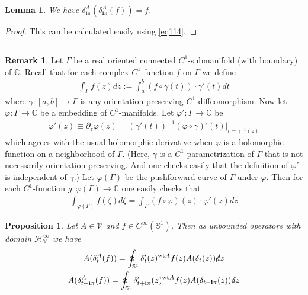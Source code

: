\documentclass[12pt,b5paper,notitlepage]{article}
\theoremstyle{definition}
\newtheorem{rem}[df]{Remark}
\theoremstyle{plain}
\newtheorem{pp}[df]{Proposition}
\newtheorem{lm}[df]{Lemma}
\newcommand{\mc}{\mathcal}
\newcommand{\im}{\mathbf{i}}
\newcommand{\Cbb}{\mathbb C}
\newcommand{\wt}{\mathrm{wt}}
\newcommand{\Sbb}{{\mathbb S}}
\newcommand{\HV}{\mathcal H_{\mathbb V}}
\newcommand{\ointn}{\oint\nolimits}
\newcommand{\sd}{\slashed{d}}
\numberwithin{equation}{section}
\begin{document}
\begin{lm}\label{lb84}
We have $\delta^A_{\im\pi}(\delta^A_{\im\pi}(f))=f$.
\end{lm}


\begin{proof}
This can be calculated easily using \eqref{eq114}.
\end{proof}





\subsection{}




\begin{rem}\label{lb77}
Let $\Gamma$ be a real oriented connected $C^1$-submanifold (with boundary) of $\Cbb$. Recall that for each complex $C^1$-function $f$ on $\Gamma$ we define
\begin{align*}
\int_\Gamma f(z)dz:=\int_a^b (f\circ\gamma(t))\cdot \gamma'(t)dt
\end{align*}  
where $\gamma:[a,b]\rightarrow\Gamma$ is any orientation-preserving $C^1$-diffeomorphism. Now let $\varphi:\Gamma\rightarrow \Cbb$ be a embedding of $C^1$-manifolds. Let $\varphi':\Gamma\rightarrow\Cbb$ be 
\begin{align}
\varphi'(z)\equiv\partial_z\varphi(z)=(\gamma'(t))^{-1}(\varphi\circ\gamma)'(t)\big|_{t=\gamma^{-1}(z)}
\end{align}
which agrees with the usual holomorphic derivative when $\varphi$ is a holomorphic function on a neighborhood of $\Gamma$. (Here, $\gamma$ is a $C^1$-parametrization of $\Gamma$ that is not necessarily orientation-preserving. And one checks easily that the definition of $\varphi'$ is independent of $\gamma$.) Let $\varphi(\Gamma)$ be the pushforward  curve of $\Gamma$ under $\varphi$. Then for each $C^1$-function $g:\varphi(\Gamma)\rightarrow\Cbb$ one easily checks that 
\begin{align*}
\int_{\varphi(\Gamma)} f(\zeta)d\zeta=\int_\Gamma (f\circ\varphi)(z)\cdot \varphi'(z)dz
\end{align*}
\end{rem}



\begin{pp}\label{lb78}
Let $A\in\mc V$ and $f\in C^\infty(\Sbb^1)$. Then as unbounded operators with domain $\HV^\infty$ we have
\begin{subequations}\label{eq101}
\begin{gather}
A(\delta_t^A(f))=\ointn_{\Sbb^1} \delta'_t(z)^{\wt A}f(z)A(\delta_t(z))\sd z\label{eq101a}\\
A(\delta^A_{t+\im\pi}(f))=\ointn_{\Sbb^1} \delta'_{t+\im\pi}(z)^{\wt A}f(z)A(\delta_{t+\im\pi}(z))\sd z\label{eq101b}
\end{gather}
\end{subequations}
\end{pp}
\end{document}

